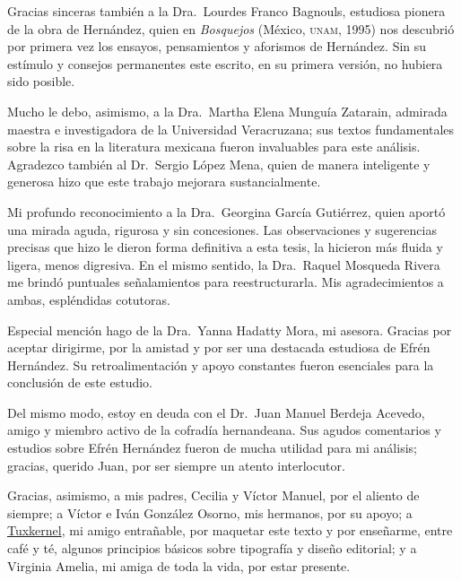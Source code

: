 \documentclass[14pt,twoside,final]{extbook} %
\begin{document}
Gracias sinceras también a la Dra.~Lourdes Franco Bagnouls, estudiosa pionera de la obra de Hernández, quien en \emph{Bosquejos} (México, \textsc{unam}, 1995) nos descubrió por primera vez los ensayos, pensamientos y aforismos de Hernández. Sin su estímulo y consejos permanentes este escrito, en su primera versión, no hubiera sido posible.

Mucho le debo, asimismo, a la Dra.~Martha Elena Munguía Zatarain, admirada maestra e investigadora de la Universidad Veracruzana; sus textos fundamentales sobre la risa en la literatura mexicana fueron invaluables para este análisis. Agradezco también al Dr.~Sergio López Mena, quien de manera inteligente y generosa hizo que este trabajo mejorara sustancialmente.

Mi profundo reconocimiento a la Dra.~Georgina García Gutiérrez, quien aportó una mirada aguda, rigurosa y sin concesiones. Las observaciones y sugerencias precisas que hizo le dieron forma definitiva a esta tesis, la hicieron más fluida y ligera, menos digresiva. En el mismo sentido, la Dra.~Raquel Mosqueda Rivera me brindó puntuales señalamientos para reestructurarla. Mis agradecimientos a ambas, espléndidas cotutoras.

Especial mención hago de la Dra.~Yanna Hadatty Mora, mi asesora. Gracias por aceptar dirigirme, por la amistad y por ser una destacada estudiosa de Efrén Hernández. Su retroalimentación y apoyo constantes fueron esenciales para la conclusión de este estudio.

Del mismo modo, estoy en deuda con el Dr.~Juan Manuel Berdeja Acevedo, amigo y miembro activo de la cofradía hernandeana. Sus agudos comentarios y estudios sobre Efrén Hernández fueron de mucha utilidad para mi análisis; gracias, querido Juan, por ser siempre un atento interlocutor.

Gracias, asimismo, a mis padres, Cecilia y Víctor Manuel, por el aliento de siempre; a Víctor e Iván González Osorno, mis hermanos, por su apoyo; a \href{muxkernel@gmail.com}{Tuxkernel}, mi amigo entrañable, por maquetar este texto y por enseñarme, entre café y té, algunos principios básicos sobre tipografía y diseño editorial; y a Virginia Amelia, mi amiga de toda la vida, por estar presente.
\end{document}
